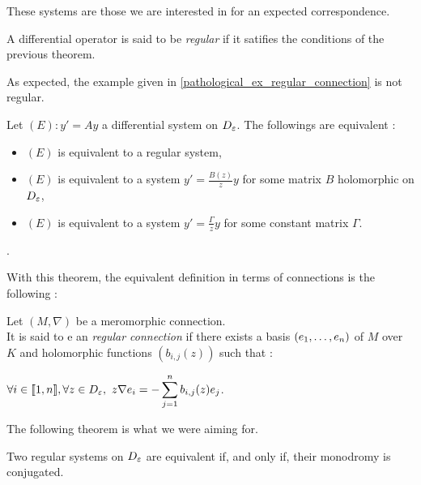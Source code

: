 These systems are those we are interested in for an expected correspondence.


\begin{mydef}
A differential operator is said to be \textit{regular} if it satifies the conditions of the previous theorem.
\end{mydef}


\begin{myex}
As expected, the example given in \ref{pathological_ex_regular_connection} is not regular.
\end{myex}


\begin{mytheo}
Let $(E) : y' = Ay$ a differential system on $D_\varepsilon$.
The followings are equivalent :
\begin{itemize}
\item[i)] $(E)$ is equivalent to a regular system,
\item[ii)] $(E)$ is equivalent to a system $y' = \frac{B(z)}{z} y$ for some matrix $B$ holomorphic on $D_\varepsilon$,
\item[iii)] $(E)$ is equivalent to a system $y' = \frac{\Gamma}{z}y$ for some constant matrix $\Gamma$.
\end{itemize}
\end{mytheo}

\begin{mydemo}
.
\end{mydemo}

With this theorem, the equivalent definition in terms of connections is the following :

\begin{mydef}
Let $(M,\nabla)$ be a meromorphic connection.\\
It is said to e an \textit{regular connection} if there exists a basis $(e_1, \dots, e_{n})$ of $M$ over $K$ and holomorphic functions $(b_{i,j}(z))$ such that :
\begin{center}
$\displaystyle \forall i \in \llbracket 1,n \rrbracket,\forall z \in D_\varepsilon, ~z\nabla e_i = -\sum_{j=1}^n b_{i,j}(z) e_j$.
\end{center}
\end{mydef}


The following theorem is what we were aiming for.


\begin{mytheo} \label{regular_connections_monodromy}
Two regular systems on $D_\varepsilon$ are equivalent if, and only if, their monodromy is conjugated.
\end{mytheo}

